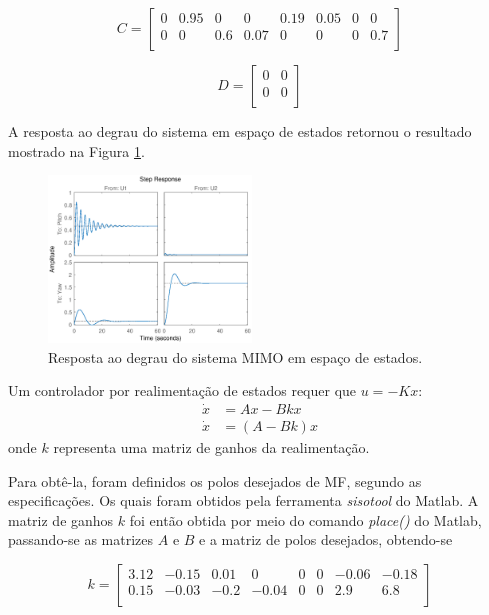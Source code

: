 $$ C = \begin{bmatrix}
        0 & 0.95 & 0 & 0 & 0.19 & 0.05 & 0 & 0 \\
        0 & 0 & 0.6 & 0.07 & 0 & 0 & 0 & 0.7 \\
        \end{bmatrix} $$

$$ D = \begin{bmatrix}
        0 & 0 \\
        0 & 0 \\
        \end{bmatrix} $$

A resposta ao degrau do sistema em espaço de estados retornou o resultado mostrado na Figura \ref{fig:StepResponseEEModel}.

\begin{figure}[H]
    \centering
    \includegraphics[width=0.48\textwidth]{figures/ControleEE/step_respons_ssmodel.eps}
    \caption{Resposta ao degrau do sistema MIMO em espaço de estados.}
    \label{fig:StepResponseEEModel}
\end{figure}

Um controlador por realimentação de estados requer que $u = - Kx$:
\begin{align*}
    \dot{x} &= A x - B k x \\
    \dot{x} &= (A - Bk) x
\end{align*}
\noindent onde $k$ representa uma matriz de ganhos da realimentação.

Para obtê-la, foram definidos os polos desejados de MF, segundo as especificações. Os quais foram obtidos pela ferramenta \textit{sisotool} do Matlab. A matriz de ganhos $k$ foi então obtida por meio do comando \textit{place()} do Matlab, passando-se as matrizes $A$ e $B$ e a matriz de polos desejados, obtendo-se

$$ k = \begin{bmatrix}
        3.12 & -0.15 & 0.01 & 0 & 0 & 0 & -0.06 & -0.18 \\
    0.15 & -0.03 & -0.2 & -0.04 & 0 & 0 & 2.9 & 6.8 \\
        \end{bmatrix} $$

